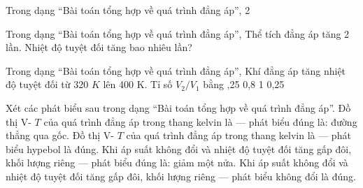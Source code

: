 \begin{ex}
Trong dạng “Bài toán tổng hợp về quá trình đẳng áp”, 2
\choiceTF

\end{ex}

\begin{ex}
Trong dạng “Bài toán tổng hợp về quá trình đẳng áp”, Thể tích đẳng áp tăng 2 lần. Nhiệt độ tuyệt đối tăng bao nhiêu lần?
\end{ex}

\begin{ex}
Trong dạng “Bài toán tổng hợp về quá trình đẳng áp”, Khí đẳng áp tăng nhiệt độ tuyệt đối từ 320 $K$ lên 400 K. Tỉ số $V_2/V_1$ bằng
\choice
{,25}
{0,8}
{1}
{0,25}
\end{ex}

\begin{ex}
Xét các phát biểu sau trong dạng “Bài toán tổng hợp về quá trình đẳng áp”.
\choiceTF
{\True Đồ thị V- $T$ của quá trình đẳng áp trong thang kelvin là — phát biểu đúng là: đường thẳng qua gốc.}
{Đồ thị V- $T$ của quá trình đẳng áp trong thang kelvin là — phát biểu hypebol là đúng.}
{\True Khi áp suất không đổi và nhiệt độ tuyệt đối tăng gấp đôi, khối lượng riêng — phát biểu đúng là: giảm một nửa.}
{Khi áp suất không đổi và nhiệt độ tuyệt đối tăng gấp đôi, khối lượng riêng — phát biểu không đổi là đúng.}
\end{ex}

